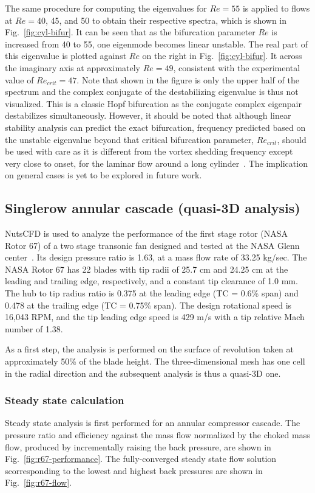 \documentclass[journal,final]{new-aiaa}
\begin{document}
The same procedure for computing the eigenvalues for $Re=55$ is applied to flows at $Re=40$, 45, and 50
to obtain their respective spectra, which is shown in Fig.~\ref{fig:cyl-bifur}. It can be seen that as the
bifurcation parameter $Re$ is increased from 40 to 55, one eigenmode becomes linear unstable. The
real part of this eigenvalue is plotted against $Re$ on the right in Fig.~\ref{fig:cyl-bifur}. It across the
imaginary axis at approximately $Re=49$, consistent with the experimental value of $Re_{crit}=47$.
Note that shown in the figure is only the upper half of the spectrum and the complex conjugate of
the destabilizing eigenvalue is thus not visualized. This is a classic Hopf bifurcation as the conjugate
complex eigenpair destabilizes simultaneously. However, it should be noted
that although linear stability analysis can predict the exact bifurcation, frequency predicted
based on the unstable eigenvalue beyond that
critical bifurcation parameter, $Re_{crit}$, should be used with care as it is different
from the vortex shedding frequency except very close to onset, for the laminar flow
around a long cylinder~\cite{barkley2006linear}. The implication on general cases
is yet to be explored in future work.

\subsection{Singlerow annular cascade (quasi-3D analysis)}
NutsCFD is used to analyze the performance of the first
stage rotor (NASA Rotor 67) of a two stage transonic fan
designed and tested at the NASA Glenn center~\cite{strazisar1989laser}.
Its design pressure ratio is
1.63, at a mass flow rate of 33.25 kg/sec. 
The NASA Rotor 67 has 22 blades with tip radii of 25.7 cm
and 24.25 cm at the leading and trailing edge, respectively,
and a constant tip clearance of 1.0 mm. The hub to tip radius
ratio is 0.375 at the leading edge (TC = 0.6\% span) and 0.478
at the trailing edge (TC = 0.75\% span). The design rotational
speed is 16,043 RPM, and the tip leading edge speed is 429 m/s
with a tip relative Mach number of 1.38.

As a first step, the analysis is performed on the surface of
revolution taken at approximately 50\% of the blade height.
The three-dimensional mesh has one cell in the radial direction
and the subsequent analysis is thus a quasi-3D one.

\subsubsection{Steady state calculation}
Steady state analysis is first performed for an annular compressor cascade.
The pressure ratio and efficiency against the mass flow normalized by the
choked mass flow, produced by incrementally raising the back pressure,
are shown in Fig.~\ref{fig:r67-performance}.
The fully-converged steady state flow solution scorresponding to the
lowest and highest back pressures are shown in Fig.~\ref{fig:r67-flow}.
\end{document}
